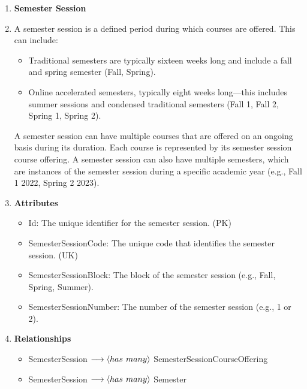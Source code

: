 \documentclass[12pt]{article}
\begin{document}
\begin{appendices}
\begin{enumerate}[label=(\roman*)]
    \item \textbf{Semester Session}
    \item[] A semester session is a defined period during which courses are offered. This can include:
        \begin{itemize}
            \item Traditional semesters are typically sixteen weeks long and include a fall and spring semester (Fall, Spring).
            \item Online accelerated semesters, typically eight weeks long—this includes summer sessions and condensed traditional semesters (Fall 1, Fall 2, Spring 1, Spring 2).
        \end{itemize}
    A semester session can have multiple courses that are offered on an ongoing basis during its duration. Each course is represented by its semester session course offering. A semester session can also have multiple semesters, which are instances of the semester session during a specific academic year (e.g., Fall 1 2022, Spring 2 2023).
    \item[] \textbf{Attributes}
    \begin{itemize}
        \item Id: The unique identifier for the semester session. (PK)
        \item SemesterSessionCode: The unique code that identifies the semester session. (UK)
        \item SemesterSessionBlock: The block of the semester session (e.g., Fall, Spring, Summer).
        \item SemesterSessionNumber: The number of the semester session (e.g., 1 or 2).
    \end{itemize}
    \item[] \textbf{Relationships}
    \begin{itemize}
        \item SemesterSession $ \longrightarrow \langle has \hspace{0.125cm} many \rangle $ SemesterSessionCourseOffering
        \item SemesterSession $ \longrightarrow \langle has \hspace{0.125cm} many \rangle $ Semester
    \end{itemize}


\end{enumerate}
\end{appendices}
\end{document}
